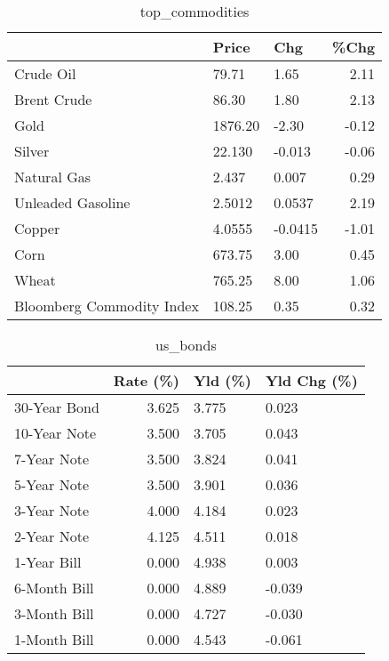 \documentclass{article}%
\begin{document}
\begin{table}[htbp]%
\caption{top\_commodities}%
\centering%
\begin{adjustbox}{width=1\textwidth}%
\begin{tabular}{lllr}
\toprule
                          &   Price &     Chg &  \%Chg \\
\midrule
               Crude Oil  &   79.71 &    1.65 &  2.11 \\
             Brent Crude  &   86.30 &    1.80 &  2.13 \\
                    Gold  & 1876.20 &   -2.30 & -0.12 \\
                  Silver  &  22.130 &  -0.013 & -0.06 \\
             Natural Gas  &   2.437 &   0.007 &  0.29 \\
       Unleaded Gasoline  &  2.5012 &  0.0537 &  2.19 \\
                  Copper  &  4.0555 & -0.0415 & -1.01 \\
                    Corn  &  673.75 &    3.00 &  0.45 \\
                   Wheat  &  765.25 &    8.00 &  1.06 \\
Bloomberg Commodity Index &  108.25 &    0.35 &  0.32 \\
\bottomrule
\end{tabular}
%
\end{adjustbox}%
\end{table}

%


\begin{table}[htbp]%
\caption{us\_bonds}%
\centering%
\begin{adjustbox}{width=1\textwidth}%
\begin{tabular}{lrll}
\toprule
             &  Rate (\%) & Yld (\%) & Yld Chg (\%) \\
\midrule
30-Year Bond &     3.625 &   3.775 &       0.023 \\
10-Year Note &     3.500 &   3.705 &       0.043 \\
 7-Year Note &     3.500 &   3.824 &       0.041 \\
 5-Year Note &     3.500 &   3.901 &       0.036 \\
 3-Year Note &     4.000 &   4.184 &       0.023 \\
 2-Year Note &     4.125 &   4.511 &       0.018 \\
 1-Year Bill &     0.000 &   4.938 &       0.003 \\
6-Month Bill &     0.000 &   4.889 &      -0.039 \\
3-Month Bill &     0.000 &   4.727 &      -0.030 \\
1-Month Bill &     0.000 &   4.543 &      -0.061 \\
\bottomrule
\end{tabular}
%
\end{adjustbox}%
\end{table}
\end{document}
